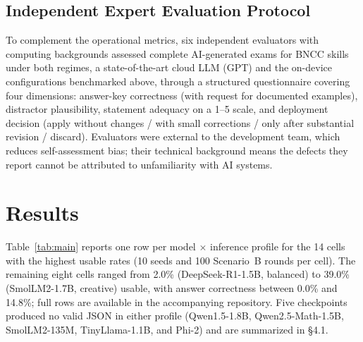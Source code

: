 \documentclass[fleqn,10pt]{JLA_article}
\begin{document}
\subsection{Independent Expert Evaluation Protocol}
To complement the operational metrics, six independent evaluators with computing backgrounds assessed complete AI-generated exams for BNCC skills under both regimes, a state-of-the-art cloud LLM (GPT) and the on-device configurations benchmarked above, through a structured questionnaire covering four dimensions: answer-key correctness (with request for documented examples), distractor plausibility, statement adequacy on a 1--5 scale, and deployment decision (apply without changes / with small corrections / only after substantial revision / discard). Evaluators were external to the development team, which reduces self-assessment bias; their technical background means the defects they report cannot be attributed to unfamiliarity with AI systems.
\section{Results}
Table~\ref{tab:main} reports one row per model $\times$ inference profile for the 14 cells with the highest usable rates (10 seeds and 100 Scenario~B rounds per cell). The remaining eight cells ranged from 2.0\% (DeepSeek-R1-1.5B, balanced) to 39.0\% (SmolLM2-1.7B, creative) usable, with answer correctness between 0.0\% and 14.8\%; full rows are available in the accompanying repository. Five checkpoints produced no valid JSON in either profile (Qwen1.5-1.8B, Qwen2.5-Math-1.5B, SmolLM2-135M, TinyLlama-1.1B, and Phi-2) and are summarized in \S4.1.
\end{document}

